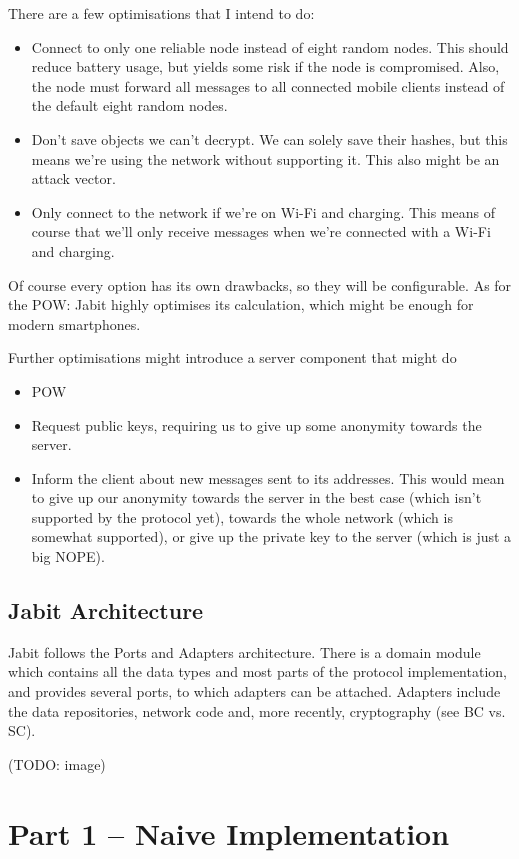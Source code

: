 \documentclass{bfh}
\begin{document}
  There are a few optimisations that I intend to do:
  \begin{itemize}
    \item Connect to only one reliable node instead of eight random nodes. This should reduce battery usage, but yields some risk if the node is compromised. Also, the node must forward all messages to all connected mobile clients instead of the default eight random nodes.
    \item Don't save objects we can't decrypt. We can solely save their hashes, but this means we're using the network without supporting it. This also might be an attack vector.
    \item Only connect to the network if we're on Wi-Fi and charging. This means of course that we'll only receive messages when we're connected with a Wi-Fi and charging.
  \end{itemize}
  Of course every option has its own drawbacks, so they will be configurable. As for the POW: Jabit highly optimises its calculation, which might be enough for modern smartphones.

  Further optimisations might introduce a server component that might do
  \begin{itemize}
    \item POW
    \item Request public keys, requiring us to give up some anonymity towards the server.
    \item Inform the client about new messages sent to its addresses. This would mean to give up our anonymity towards the server in the best case (which isn't supported by the protocol yet), towards the whole network (which is somewhat supported), or give up the private key to the server (which is just a big NOPE).
  \end{itemize}

  \subsection{Jabit Architecture}
  Jabit follows the Ports and Adapters architecture. There is a domain module which contains all the data types and most parts of the protocol implementation, and provides several ports, to which adapters can be attached. Adapters include the data repositories, network code and, more recently, cryptography (see BC vs. SC).

  (TODO: image)
  
  \section{Part 1 -- Naive Implementation}
  
\end{document}
